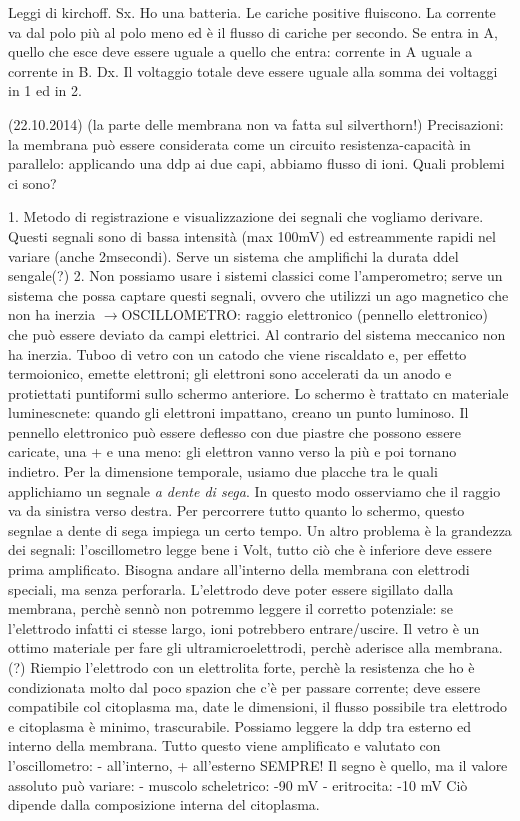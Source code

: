 \documentclass[a4paper,12pt]{article}
\newcommand{\freccia}{\ensuremath{\rightarrow}}
\begin{document}
Leggi di kirchoff. 
Sx. Ho una batteria. Le cariche positive fluiscono. La corrente va dal polo più al polo meno ed è il flusso di cariche per secondo. Se entra in A, quello che esce deve essere uguale a quello che entra: corrente in A uguale a corrente in B.
Dx. Il voltaggio totale deve essere uguale alla somma dei voltaggi in 1 ed in 2.

(22.10.2014)
(la parte delle membrana non va fatta sul silverthorn!)
Precisazioni:
la membrana può essere considerata come un circuito resistenza-capacità in parallelo: applicando una ddp ai due capi, abbiamo flusso di ioni. Quali problemi ci sono?

1. Metodo di registrazione e visualizzazione dei segnali che vogliamo derivare. Questi segnali sono di bassa intensità (max 100mV) ed estreammente rapidi nel variare (anche 2msecondi). Serve un sistema che amplifichi la durata ddel sengale(?)
2. Non possiamo usare i sistemi classici come l'amperometro; serve un sistema che possa captare questi segnali, ovvero che utilizzi un ago magnetico che non ha inerzia \freccia OSCILLOMETRO: raggio elettronico (pennello elettronico) che può essere deviato da campi elettrici. Al contrario del sistema meccanico non ha inerzia. Tuboo di vetro con un catodo che viene riscaldato e, per effetto termoionico, emette elettroni; gli elettroni sono accelerati da un anodo e protiettati puntiformi sullo schermo anteriore. Lo schermo è trattato cn materiale luminescnete: quando gli elettroni impattano, creano un punto luminoso.
Il pennello elettronico può essere deflesso con due piastre che possono essere caricate, una + e una meno: gli elettron vanno verso la più e poi tornano indietro.
Per la dimensione temporale, usiamo due placche tra le quali applichiamo un segnale \emph{a dente di sega}. In questo modo osserviamo che il raggio va da sinistra verso destra. Per percorrere tutto quanto lo schermo, questo segnlae a dente di sega impiega un certo tempo.
Un altro problema è la grandezza dei segnali: l'oscillometro legge bene i Volt, tutto ciò che è inferiore deve essere prima amplificato.
Bisogna andare all'interno della membrana con elettrodi speciali, ma senza perforarla. L'elettrodo deve poter essere sigillato dalla membrana, perchè sennò non potremmo leggere il corretto potenziale: se l'elettrodo infatti ci stesse largo, ioni potrebbero entrare/uscire. Il vetro è un ottimo materiale per fare gli ultramicroelettrodi, perchè aderisce alla membrana. (?)
Riempio l'elettrodo con un elettrolita forte, perchè la resistenza che ho è condizionata molto dal poco spazion che c'è per passare corrente; deve essere compatibile col citoplasma ma, date le dimensioni, il flusso possibile tra elettrodo e citoplasma è minimo, trascurabile.
Possiamo leggere la ddp tra esterno ed interno della membrana. Tutto questo viene amplificato e valutato con l'oscillometro: - all'interno, + all'esterno SEMPRE! Il segno è quello, ma il valore assoluto può variare:
- muscolo scheletrico: -90 mV
- eritrocita: -10 mV
Ciò dipende dalla composizione interna del citoplasma.
\end{document}
